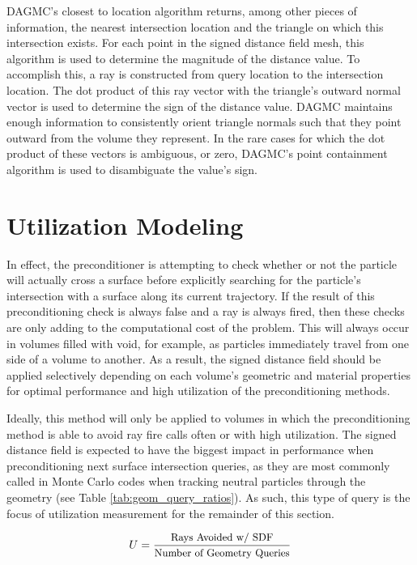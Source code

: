 DAGMC's closest to location algorithm returns, among other pieces of
information, the nearest intersection location and the triangle on which this
intersection exists. For each point in the signed distance field mesh, this
algorithm is used to determine the magnitude of the distance value. To
accomplish this, a ray is constructed from query location to the intersection
location. The dot product of this ray vector with the triangle's outward normal
vector is used to determine the sign of the distance value. DAGMC maintains
enough information to consistently orient triangle normals such that they point
outward from the volume they represent. In the rare cases for which the dot
product of these vectors is ambiguous, or zero, DAGMC's point containment
algorithm is used to disambiguate the value's sign.

\section{Utilization Modeling}\label{sec:preconditioner_utilization}

In effect, the preconditioner is attempting to check whether or not the particle
will actually cross a surface before explicitly searching for the particle's
intersection with a surface along its current trajectory. If the result of this
preconditioning check is always false and a ray is always fired, then these
checks are only adding to the computational cost of the problem. This will
always occur in volumes filled with void, for example, as particles immediately
travel from one side of a volume to another. As a result, the signed distance field
should be applied selectively depending on each volume's geometric and material
properties for optimal performance and high utilization of the preconditioning
methods.

Ideally, this method will only be applied to volumes in which the
preconditioning method is able to avoid ray fire calls often or with high
utilization. The signed distance field is expected to have the biggest impact in
performance when preconditioning next surface intersection queries, as they are
most commonly called in Monte Carlo codes when tracking neutral particles
through the geometry (see Table \ref{tab:geom_query_ratios}). As such, this type
of query is the focus of utilization measurement for the remainder of this
section.


\begin{equation}
  U = \frac{ \small \text{Rays Avoided w/ SDF} }{ \small \text{Number of Geometry Queries} } 
   \label{eq:preconditioner_utilization}
\end{equation}

